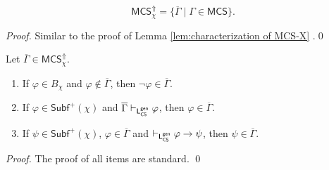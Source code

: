 \documentclass[envcountsect,envcountsame,oribibl,orivec]{llncs}
\newcommand{\tgeneralize}{\Uparrow}
\newcommand{\CS}{\textsf{CS}}
\renewcommand{\phi}{\varphi}
\newcommand{\Subf}{\mathsf{Subf}}
\newcommand{\MCS}{\mathsf{MCS}}
\begin{document}
\begin{lemma}
	\[
	\MCS_\chi^\tgeneralize = \{\overline{\Gamma} \mid \Gamma\in\MCS \}.
	\]
\end{lemma}
\begin{proof}
Similar to the proof of Lemma \ref{lem:characterization of MCS-X} .\qed
\end{proof}

\begin{lemma}\label{lem: Facts about MCS-chi for generalize}
	Let  $\overline{\Gamma} \in \MCS_\chi^\tgeneralize$.
	
	\begin{enumerate}
			
		\item If $\phi \in B_\chi$ and  $\phi \not\in \overline{\Gamma}$, then $\neg \phi \in \overline{\Gamma}$.
		
		\item If $\phi \in \Subf^+(\chi)$ and  $\overline{\Gamma} \vdash_{{\sf L}^{\sf gen}_\CS} \phi$, then $\phi \in \overline{\Gamma}$.
		
		\item If $\psi \in \Subf^+(\chi)$, $\phi \in \overline{\Gamma}$ and $\vdash_{{\sf L}^{\sf gen}_\CS} \phi \rightarrow \psi$, then $\psi \in \overline{\Gamma}$.
	
	\end{enumerate}
\end{lemma}
\begin{proof}
	The proof of all items are standard. \qed 
\end{proof}
\end{document}
